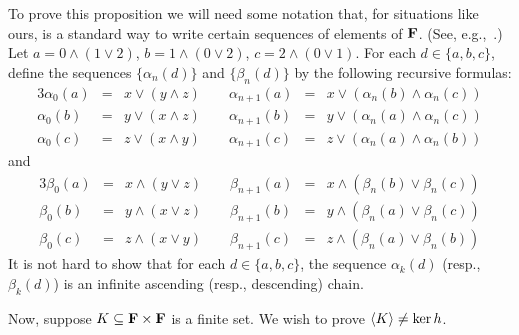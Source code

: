 To prove this proposition we will need some notation that, for situations like ours, 
is a standard way to write certain sequences of elements of $\mathbf{F}$. (See, e.g.,~\cite{MR1319815}.) 
Let $a = 0 \wedge (1 \vee 2)$, $b = 1 \wedge (0 \vee 2)$, $c = 2 \wedge (0 \vee 1)$.
For each $d\in \{a, b, c\}$, define the sequences $\{\alpha_n(d)\}$ and $\{\beta_n(d)\}$ 
by the following recursive formulas:
\begin{alignat*}{3}
  \alpha_0(a) &=& x \vee (y \wedge z) \qquad \alpha_{n+1}(a)   &= &x \vee (\alpha_n(b) \wedge \alpha_n(c))\\
  \alpha_0(b) &=& y \vee (x \wedge z)\qquad \alpha_{n+1}(b)   &= &y \vee (\alpha_n(a) \wedge \alpha_n(c))\\
  \alpha_0(c)   &=& z \vee (x \wedge y)\qquad  \alpha_{n+1}(c)   &= &z \vee (\alpha_n(a) \wedge \alpha_n(b))
\end{alignat*}
and 
\begin{alignat*}{3}
  \beta_0(a)   &= &x \wedge (y \vee z)  \qquad \beta_{n+1}(a)   &= &x \wedge (\beta_n(b) \vee \beta_n(c))\\
  \beta_0(b)   &= & y \wedge (x \vee z)  \qquad  \beta_{n+1}(b)   &=& y \wedge (\beta_n(a) \vee \beta_n(c))\\
  \beta_0(c)   &= &z \wedge (x \vee y) \qquad   \beta_{n+1}(c)   &=& z \wedge (\beta_n(a) \vee \beta_n(b))
\end{alignat*}
It is not hard to show that for each $d \in \{a,b,c\}$, the sequence $\alpha_k(d)$ (resp., $\beta_k(d)$) is
an infinite ascending (resp., descending) chain.

Now, suppose $K \subseteq \mathbf{F} \times \mathbf{F}$ is a finite set. 
We wish to prove $\langle K\rangle \neq \ker h$.

